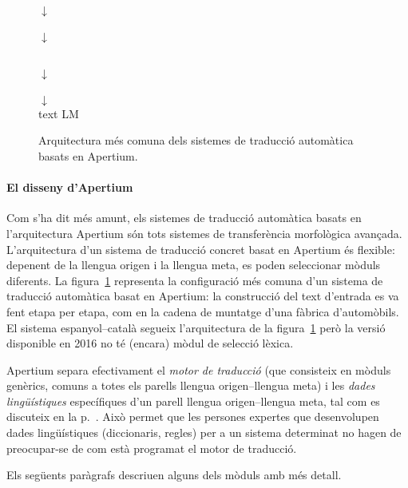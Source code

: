 \begin{figure}
{\begin{center}
{{\begin{center}
\(\downarrow\)\\
 \\
\(\downarrow\)\\
\vspace{-3ex}
\end{center}
}}
\\
\(\downarrow\)\\
 \\
\(\downarrow\)\\
text LM \\
\end{center}
}
\caption{Arquitectura més comuna dels sistemes de traducció automàtica basats en Apertium.}
\label{fg:modules}
\end{figure}

\paragraph{El disseny d'Apertium}
Com s'ha dit més amunt, els sistemes de traducció automàtica basats en
l'arquitectura Apertium són tots sistemes de transferència morfològica
avançada. L'arquitectura d'un sistema de traducció concret basat en
Apertium és flexible: depenent de la llengua origen i la llengua meta,
es poden seleccionar mòduls diferents. La figura~\ref{fg:modules}
representa la configuració més comuna d'un sistema de traducció
automàtica basat en Apertium: la construcció del text d'entrada es va
fent etapa per etapa, com en la cadena de muntatge d'una fàbrica
d'automòbils. El sistema espanyol--català segueix l'arquitectura de la
figura~\ref{fg:modules} però la versió disponible en 2016 no té
(encara) mòdul de selecció lèxica.

Apertium separa efectivament el \emph{motor de traducció} (que
consisteix en mòduls genèrics, comuns a totes els parells llengua
origen--llengua meta) i les \emph{dades lingüístiques} específiques
d'un parell llengua origen--llengua meta, tal com es discuteix en
la p.~\pageref{pg:separacio}. Això permet que les persones expertes que
desenvolupen dades lingüístiques (diccionaris, regles) per a un
sistema determinat no hagen de preocupar-se de com està programat el
motor de traducció.

Els següents paràgrafs descriuen alguns dels mòduls amb més detall.


